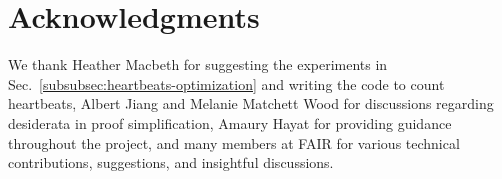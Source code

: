 \section{Acknowledgments}
We thank Heather Macbeth for suggesting the experiments in Sec.~\ref{subsubsec:heartbeats-optimization} and writing the code to count heartbeats, Albert Jiang and Melanie Matchett Wood for discussions regarding desiderata in proof simplification, Amaury Hayat for providing guidance throughout the project, and many members at FAIR for various technical contributions, suggestions, and insightful discussions.
